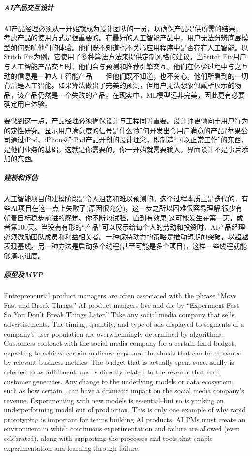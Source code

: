 \documentclass[letterpaper,11pt,english]{sphinxmanual}
\begin{document}
\subparagraph{AI产品交互设计}
\label{\detokenize{chapter_project/process:ai}}
AI产品经理必须从一开始就成为设计团队的一员，以确保产品提供所需的结果。考虑产品的使用方式是很重要的。在最好的人工智能产品中，用户无法分辨底层模型如何影响他们的体验。他们既不知道也不关心应用程序中是否存在人工智能。以Stitch
Fix为例，它使用了多种算法方法来提供定制风格的建议。当Stitch
Fix用户与人工智能产品交互时，他们会与预测和推荐引擎交互。他们在体验过程中与之互动的信息是一种人工智能产品——但他们既不知道，也不关心，他们所看到的一切背后是人工智能。如果算法做出了完美的预测，但用户无法想象佩戴所展示的物品，该产品仍然是一个失败的产品。在现实中，ML模型远非完美，因此更有必要确定用户体验。

要做到这一点，产品经理必须确保设计与工程同等重要。设计师更倾向于用户行为的定性研究。显示用户满意度的信号是什么?如何开发出令用户满意的产品?苹果公司通过iPod、iPhone和iPad产品开创的设计理念，即制造“可以正常工作”的东西，是他们业务的基础。这就是你需要的，你一开始就需要输入。界面设计不是事后添加的东西。


\subparagraph{建模和评估}
\label{\detokenize{chapter_project/process:id23}}
人工智能项目的建模阶段是令人沮丧和难以预测的。这个过程本质上是迭代的，有些AI项目在这一点上失败了(原因很充分)。这一步之所以困难很容易理解:很少有朝着目标稳步前进的感觉。你不断地试验，直到有效果;这可能发生在第一天，或者第100天。当没有有形的“产品”可以展示给每个人的劳动和投资时，AI产品经理必须激励团队成员和利益相关者。一种保持动力的策略是推动短期的突破，以超越表现基线。另一种方法是启动多个线程(甚至可能是多个项目)，这样一些线程就能够演示进度。


\subparagraph{原型及MVP}
\label{\detokenize{chapter_project/process:mvp}}
Entrepreneurial product managers are often associated with the phrase
“Move Fast and Break Things.” AI product mangers live and die by
“Experiment Fast So You Don’t Break Things Later.” Take any social media
company that sells advertisements. The timing, quantity, and type of ads
displayed to segments of a company’s user population are overwhelmingly
determined by algorithms. Customers contract with the social media
company for a certain fixed budget, expecting to achieve certain
audience exposure thresholds that can be measured by relevant business
metrics. The budget that is actually spent successfully is referred to
as fulfillment, and is directly related to the revenue that each
customer generates. Any change to the underlying models or data
ecosystem, such as how certain ,
can have a dramatic impact on the social media company’s revenue.
Experimenting with new models is essential–but so is yanking an
underperforming model out of production. This is only one example of why
rapid prototyping is important for teams building AI products. AI PMs
must create an environment in which continuous experimentation and
failure are allowed (even celebrated), along with supporting the
processes and tools that enable experimentation and learning through
failure.
\end{document}
